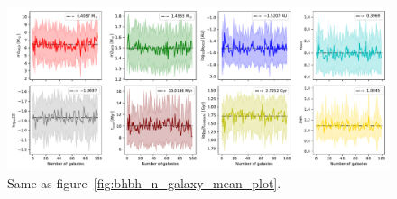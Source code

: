 \begin{figure}[!h]
	\centering
	\includegraphics[width=\columnwidth]{analysis_data/varE_main_file_analysis/BHNS_n_galaxy_mean_plot}
	\caption{Same as figure~\ref{fig:bhbh_n_galaxy_mean_plot}.}
	\label{fig:bhns_n_galaxy_mean_plot}
\end{figure}
